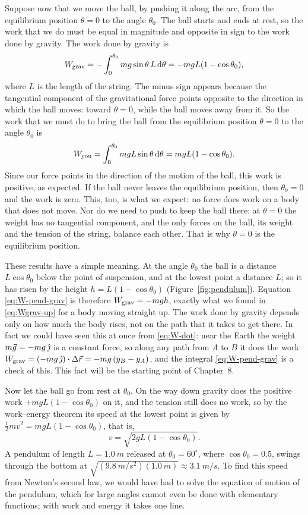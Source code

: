 \documentclass[11pt,a4paper]{article}
\begin{document}
Suppose now that we move the ball, by pushing it along the arc, from the equilibrium position
$\theta = 0$ to the angle $\theta_0$. The ball starts and ends at rest, so the work that we do must be
equal in magnitude and opposite in sign to the work done by gravity. The work done by gravity is
\begin{equation}\label{eq:W-pend-grav}
  W_{\mathrm{grav}} = -\int_0^{\theta_0} mg\sin\theta\,L\,\mathrm{d}\theta = -mgL(1 - \cos\theta_0) ,
\end{equation}
where $L$ is the length of the string. The minus sign appears because the tangential component of the
gravitational force points opposite to the direction in which the ball moves: toward $\theta = 0$,
while the ball moves away from it. So the work that we must do to bring the ball from the equilibrium
position $\theta = 0$ to the angle $\theta_0$ is
\begin{equation}\label{eq:W-pend}
  W_{\mathrm{you}} = \int_0^{\theta_0} mgL\sin\theta\,\mathrm{d}\theta = mgL(1 - \cos\theta_0) .
\end{equation}
Since our force points in the direction of the motion of the ball, this work is positive, as expected.
If the ball never leaves the equilibrium position, then $\theta_0 = 0$ and the work is zero. This, too,
is what we expect: no force does work on a body that does not move. Nor do we need to push to keep
the ball there: at $\theta = 0$ the weight has no tangential component, and the only forces on the
ball, its weight and the tension of the string, balance each other. That is why $\theta = 0$ is the
equilibrium position.

These results have a simple meaning. At the angle $\theta_0$ the ball is a distance $L\cos\theta_0$
below the point of suspension, and at the lowest point a distance $L$; so it has risen by the height
$h = L(1 - \cos\theta_0)$ (Figure~\ref{fig:pendulum}). Equation \eqref{eq:W-pend-grav} is therefore
$W_{\mathrm{grav}} = -mgh$, exactly what we found in \eqref{eq:Wgrav-up} for a body moving straight up. The
work done by gravity depends only on how much the body rises, not on the path that it takes to get
there. In fact we could have seen this at once from \eqref{eq:W-dot}: near the Earth the weight
$m\vec{g} = -mg\,\hat{\jmath}$ is a constant force, so along any path from $A$ to $B$ it does the work
$W_{\mathrm{grav}} = (-mg\,\hat{\jmath})\cdot\Delta\vec{r} = -mg\,(y_B - y_A)$, and the integral
\eqref{eq:W-pend-grav} is a check of this. This fact will be the starting point of Chapter~8.

Now let the ball go from rest at $\theta_0$. On the way down gravity does the positive work
$+mgL(1 - \cos\theta_0)$ on it, and the tension still does no work, so by the work--energy theorem its
speed at the lowest point is given by $\frac12 mv^2 = mgL(1 - \cos\theta_0)$, that is,
\[
  v = \sqrt{2gL(1 - \cos\theta_0)} .
\]
A pendulum of length $L = \qty{1.0}{m}$ released at $\theta_0 = 60^\circ$, where $\cos\theta_0 = 0.5$,
swings through the bottom at $\sqrt{(\qty{9.8}{m/s^2})(\qty{1.0}{m})} \approx \qty{3.1}{m/s}$. To find
this speed from Newton's second law, we would have had to solve the equation of motion of the
pendulum, which for large angles cannot even be done with elementary functions; with work and energy
it takes one line.
\end{document}
